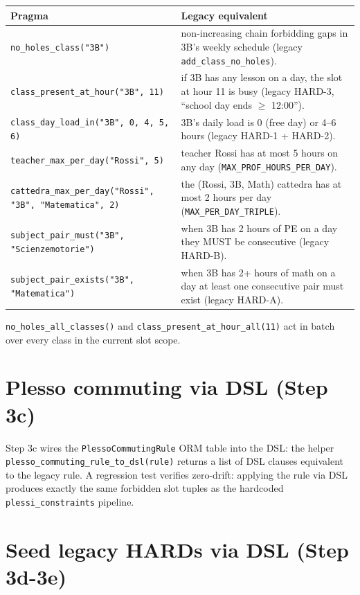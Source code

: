 \begin{tabular}{lp{6.7cm}}
\toprule
\textbf{Pragma} & \textbf{Legacy equivalent} \\
\midrule
\texttt{no\_holes\_class("3B")} &
  non-increasing chain forbidding gaps in 3B's weekly schedule
  (legacy \texttt{add\_class\_no\_holes}). \\
\texttt{class\_present\_at\_hour("3B", 11)} &
  if 3B has any lesson on a day, the slot at hour 11 is busy
  (legacy HARD-3, ``school day ends $\geq$ 12:00''). \\
\texttt{class\_day\_load\_in("3B", 0, 4, 5, 6)} &
  3B's daily load is 0 (free day) or 4--6 hours (legacy
  HARD-1 + HARD-2). \\
\texttt{teacher\_max\_per\_day("Rossi", 5)} &
  teacher Rossi has at most 5 hours on any day
  (\texttt{MAX\_PROF\_HOURS\_PER\_DAY}). \\
\texttt{cattedra\_max\_per\_day("Rossi", "3B", "Matematica", 2)} &
  the (Rossi, 3B, Math) cattedra has at most 2 hours per day
  (\texttt{MAX\_PER\_DAY\_TRIPLE}). \\
\texttt{subject\_pair\_must("3B", "Scienzemotorie")} &
  when 3B has 2 hours of PE on a day they MUST be consecutive
  (legacy HARD-B). \\
\texttt{subject\_pair\_exists("3B", "Matematica")} &
  when 3B has 2+ hours of math on a day at least one
  consecutive pair must exist (legacy HARD-A). \\
\bottomrule
\end{tabular}

\medskip

\texttt{no\_holes\_all\_classes()} and
\texttt{class\_present\_at\_hour\_all(11)} act in batch over
every class in the current slot scope.

\section{Plesso commuting via DSL (Step 3c)}

Step 3c wires the \texttt{PlessoCommutingRule} ORM table into
the DSL: the helper
\texttt{plesso\_commuting\_rule\_to\_dsl(rule)} returns a list
of DSL clauses equivalent to the legacy rule. A regression
test verifies zero-drift: applying the rule via DSL produces
exactly the same forbidden slot tuples as the hardcoded
\texttt{plessi\_constraints} pipeline.

\section{Seed legacy HARDs via DSL (Step 3d-3e)}

